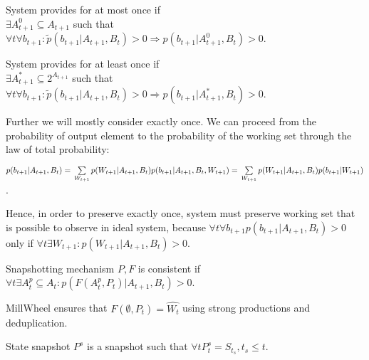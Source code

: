 \begin{definition}{System provides for at most once}
if \\
$\exists{A^{0}_{t+1}\subseteq{A_{t+1}}}$ such that \\
$\forall{t} \forall{b_{t+1}}: \widetilde{p}(b_{t+1}|A_{t+1},B_t)>0 \Rightarrow p(b_{t+1}|A^{0}_{t+1},B_t)>0$.
\end{definition}

\begin{definition}{System provides for at least once}
if \\
$\exists{A^{*}_{t+1}\subseteq{2^{A_{t+1}}}}$ such that \\
$\forall{t} \forall{b_{t+1}}: \widetilde{p}(b_{t+1}|A_{t+1},B_t)>0 \Rightarrow p(b_{t+1}|A^{*}_{t+1},B_t)>0$.
\end{definition}

Further we will mostly consider exactly once. We can proceed from the probability of output element to the probability of the working set through the law of total probability:

$p(b_{t+1}|A_{t+1},B_t)=\\
\sum\limits_{W_{t+1}}p(W_{t+1}|A_{t+1},B_t)p(b_{t+1}|A_{t+1},B_t,W_{t+1})=\\
\sum\limits_{W_{t+1}}p(W_{t+1}|A_{t+1},B_t)p(b_{t+1}|W_{t+1})
$.

Hence, in order to preserve exactly once, system must preserve working set that is possible to observe in ideal system, because $\forall{t} \forall{b_{t+1}} p(b_{t+1}|A_{t+1},B_t)>0$ only if $\forall{t} \exists{W_{t+1}}:p(W_{t+1}|A_{t+1},B_t)>0$.

\begin{definition}{Snapshotting mechanism $P,F$ is consistent}
if $\forall{t} \exists{A^{p}_t\subseteq{A_t}} : p(F(A^{p}_t,P_t)|A_{t+1},B_t)>0$.
\end{definition}

MillWheel ensures that $F(\emptyset,P_t)=\widehat{W_t}$ using strong productions and deduplication.

\begin{definition}{State snapshot}
$P^{s}$ is a snapshot such that $\forall{t} P^{s}_t = S_{t_s},t_s \leq t$.
\end{definition}

